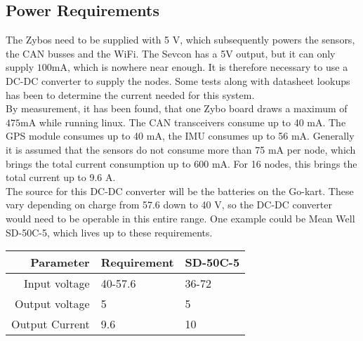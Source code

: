
\subsection{Power Requirements}\label{sec:power_requirements}
The Zybos need to be supplied with 5 V, which subsequently powers the sensors, the CAN busses and the WiFi.
The Sevcon has a 5V output, but it can only supply $\si{100 \milli \ampere}$, which is nowhere near enough.
It is therefore necessary to use a DC-DC converter to supply the nodes.
Some tests along with datasheet lookups has been to determine the current needed for this system.\\

By measurement, it has been found, that one Zybo board draws a maximum of $\si{475 \milli \ampere}$ while running linux.
The CAN transceivers consume up to 40 mA\cite{3.3V_CAN}. 
The GPS module consumes up to 40 mA, the IMU consumes up to 56 mA. 
Generally it is assumed that the sensors do not consume more than 75 mA per node, which brings the total current consumption up to 600 mA.
For 16 nodes, this brings the total current up to 9.6 A.\\

The source for this DC-DC converter will be the batteries on the Go-kart. 
These vary depending on charge from 57.6 down to 40 V, so the DC-DC converter would need to be operable in this entire range.
One example could be Mean Well SD-50C-5, which lives up to these requirements.

\begin{table}[H]
	\centering
	\begin{tabular}{r|l|l}
		Parameter & Requirement & SD-50C-5 \\
		\hline
		Input voltage & 40-57.6 & 36-72 \\
		Output voltage & 5 & 5 \\
		Output Current & 9.6 & 10
	\end{tabular}
\end{table}